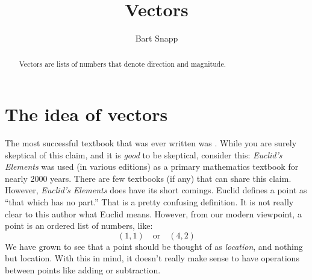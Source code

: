 \documentclass{ximera}
\author{Bart Snapp}
\title[Dig-In:]{Vectors}
\begin{document}
\begin{abstract}
  Vectors are lists of numbers that denote direction and magnitude.
\end{abstract}
\maketitle


\section{The idea of vectors}

The most successful textbook that was ever written was
. While
you are surely skeptical of this claim, and it is \textit{good} to be
skeptical, consider this: \textit{Euclid's Elements} was used (in
various editions) as a primary mathematics textbook for nearly 2000
years. There are few textbooks (if any) that can share this
claim. However, \textit{Euclid's Elements} does have its short
comings. Euclid defines a point as ``that which has no part.'' That is
a pretty confusing definition. It is not really clear to this author
what Euclid means. However, from our modern viewpoint, a point is an
ordered list of numbers, like:
\[
(1,1)\quad\text{or}\quad(4,2)
\]
We have grown to see that a point should be thought of as
\textit{location}, and nothing but location. With this in mind, it
doesn't really make sense to have operations between points like
adding or subtraction.
\end{document}
